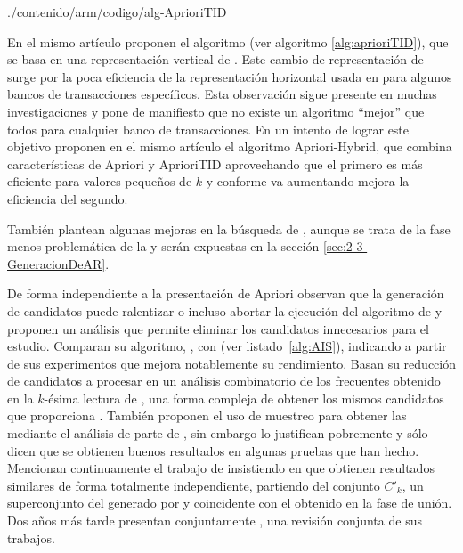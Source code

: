 
                 {./contenido/arm/codigo/alg-AprioriTID}

En el mismo artículo proponen el algoritmo  (ver algoritmo \ref{alg:aprioriTID}), que se basa en una representación vertical de \D. Este cambio de representación de \D surge por la poca eficiencia de la representación horizontal usada en \apriori para algunos bancos de transacciones específicos. Esta observación sigue presente en muchas investigaciones y pone de manifiesto que no existe un algoritmo "`mejor"' que todos para cualquier banco de transacciones. En un intento de lograr este objetivo proponen en el mismo artículo el algoritmo {Apriori-Hybrid}, que combina características de Apriori y {AprioriTID} aprovechando que el primero es más eficiente para valores pequeños de $k$ y conforme va aumentando mejora la eficiencia del segundo.

También plantean algunas mejoras en la búsqueda de \ars, aunque se trata de la fase menos problemática de la \ARM y serán expuestas en la sección \ref{sec:2-3-GeneracionDeAR}.


De forma independiente a la presentación de Apriori \citet{MannilaToivonenVerkamo-EfficientAlgorithmsForDiscoveringAR-1994} observan que la generación de candidatos puede ralentizar o incluso abortar la ejecución del algoritmo de \ARM y proponen un análisis que permite eliminar los candidatos innecesarios para el estudio. Comparan su algoritmo, , con  (ver listado~\ref{alg:AIS}), indicando a partir de sus experimentos que mejora notablemente su rendimiento. Basan su reducción de candidatos a procesar en un análisis combinatorio de los \kitemsets frecuentes obtenido en la $k$-ésima lectura de \D, una forma compleja de obtener los mismos candidatos que proporciona \apriori. También proponen el uso de muestreo para obtener las \ars mediante el análisis de parte de \D, sin embargo lo justifican pobremente y sólo dicen que se obtienen buenos resultados en algunas pruebas que han hecho. Mencionan continuamente el trabajo de \citet{AgrawalSrikant-FastAlgorithmsForMiningAssociationRules-1994} insistiendo en que obtienen resultados similares de forma totalmente independiente, partiendo del conjunto ${C'}_k$, un superconjunto del generado por \apriori y coincidente con el obtenido en la fase de unión. Dos años más tarde presentan conjuntamente \citet{AgrawalMannilaSrikantToivonenVerkamo-FastDiscoveryOfAR-1996}, una revisión conjunta de sus trabajos.


